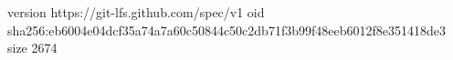 version https://git-lfs.github.com/spec/v1
oid sha256:eb6004e04dcf35a74a7a60c50844c50c2db71f3b99f48eeb6012f8e351418de3
size 2674
